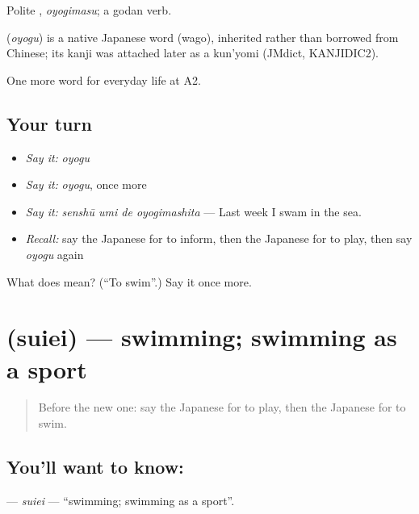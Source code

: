 Polite \textbf{}, \emph{oyogimasu}; a godan verb.

\begin{cousinweb}
\textbf{} (\emph{oyogu}) is a native Japanese word (wago), inherited rather than borrowed from Chinese; its kanji was attached later as a kun'yomi (JMdict, KANJIDIC2).
\end{cousinweb}

\begin{grammarlens}[title={What you've built}]
One more word for everyday life at A2.
\end{grammarlens}

\subsection*{Your turn}
\begin{itemize}
\raggedright
  \item \emph{Say it:} \emph{oyogu}
  \item \emph{Say it:} \emph{oyogu}, once more
  \item \emph{Say it:} \emph{senshū umi de oyogimashita} — Last week I swam in the sea.
  \item \emph{Recall:} say the Japanese for to inform, then the Japanese for to play, then say \emph{oyogu} again
\end{itemize}

\begin{tcolorbox}[breakable,colback=teal!4,colframe=teal!35!black,title={Before you move on}]
What does  mean? (\textquotedblleft{}To swim\textquotedblright{}.) Say it once more.
\end{tcolorbox}
\section[\texorpdfstring{\ja{すいえい} (suiei)}{すいえい (suiei)}]{ (suiei) — swimming; swimming as a sport}

\label{lesson:JA-C233-suiei}



\begin{quote}
Before the new one: say the Japanese for to play, then the Japanese for to swim.
\end{quote}

\subsection*{You'll want to know: }
\textbf{} — \emph{suiei} — \textquotedblleft{}swimming; swimming as a sport\textquotedblright{}.

